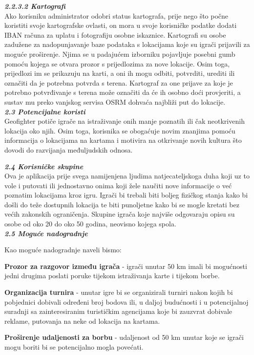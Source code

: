 		\textbf{\textit{\small2.2.3.2 Kartografi}}\\
		
		{Ako korisniku administrator odobri status kartografa, prije nego što počne koristiti svoje kartografske ovlasti, on mora u svoje korisničke podatke dodati IBAN računa za uplatu i fotografiju osobne iskaznice. Kartografi su osobe zadužene za nadopunjavanje baze podataka s lokacijama koje su igrači prijavili za moguće proširenje. Njima se u padajućem izborniku pojavljuje posebni gumb pomoću kojega se otvara prozor s prijedlozima za nove lokacije. Osim toga, prijedlozi im se prikazuju na karti, a oni ih mogu odbiti, potvrditi, urediti ili označiti da je potrebna potvrda s terena. Kartograf za one prijave za koje je potrebno potvrđivanje s terena može označiti da će ih osobno doći provjeriti, a sustav mu preko vanjskog servisa OSRM dohvaća najbliži put do lokacije.} \\
		
		\textbf{\textit{\large 2.3 Potencijalne koristi}}\\
		
		{Geofighter potiče igrače na istraživanje onih manje poznatih ili čak neotkrivenih lokacija oko njih. Osim toga, korisnika se obogaćuje novim znanjima pomoću informacija o lokacijama na kartama i motivira na otkrivanje novih kultura što dovodi do razvijanja međuljudskih odnosa.} \newpage
		
		\textbf{\textit{\large 2.4 Korisničke skupine}}\\
		
		{Ova je aplikacija prije svega namijenjena ljudima natjecateljskoga duha koji uz to vole i putovati ili jednostavno onima koji žele naučiti nove informacije o već poznatim lokacijama kroz igru. Igrači bi trebali biti boljeg fizičkog stanja kako bi došli do teže dostupnih lokacija te biti punoljetne kako bi se mogle kretati bez većih zakonskih ograničenja. Skupine igrača koje najviše odgovaraju opisu su osobe od oko 20 do oko 50 godina, neovisno kojega spola.}\\
		
		\textbf{\textit{\large 2.5 Moguće nadogradnje}}\\
		
		{Kao moguće nadogradnje naveli bismo:
		\begin{packed_item}
			\item {\textbf{Prozor za razgovor između igrača} - igrači unutar 50 km imali bi mogućnosti jedni drugima poslati poruke tijekom istraživanja karte i tijekom borbe.}\\
			\item {\textbf{Organizacija turnira} - unutar igre bi se organizirali turniri nakon kojih bi pobjednici dobivali određeni broj bodova ili, u daljoj budućnosti i u potencijalnoj suradnji sa zainteresiranim turističkim agencijama koje bi zauzvrat dobivale reklame, putovanja na neke od lokacija na kartama.}\\
			\item {\textbf{Proširenje udaljenosti za borbu} - udaljenost od 50 km unutar koje se igrači mogu boriti bi se potencijalno mogla povećati.}
	\end{packed_item} }
		
		
		\eject
	